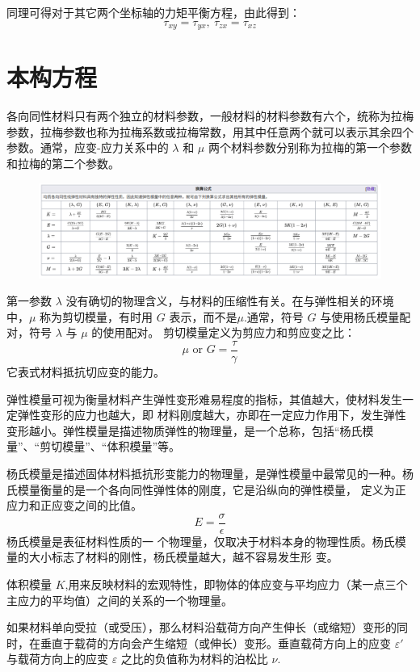 \documentclass[12pt,a4paper]{article}
\begin{document}
同理可得对于其它两个坐标轴的力矩平衡方程，由此得到：
$$
\tau_{xy}=\tau_{yx}, ~ \tau_{zx}=\tau_{xz}
$$

\section{本构方程}
各向同性材料只有两个独立的材料参数，一般材料的材料参数有六个，统称为拉梅参数，拉梅参数也称为拉梅系数或拉梅常数，用其中任意两个就可以表示其余四个参数。通常，应变-应力关系中的 $\lambda$ 和 $\mu$ 两个材料参数分别称为拉梅的第一个参数和拉梅的第二个参数。

\begin{figure}[H]
\centering
\includegraphics[scale=0.48]{./figures/19.png}
\caption{}
\end{figure}

第一参数 $\lambda$ 没有确切的物理含义，与材料的压缩性有关。在与弹性相关的环境中，$\mu$ 称为剪切模量，有时用 $G$ 表示，而不是$\mu$.通常，符号 $G$ 与使用杨氏模量配对，符号 $\lambda$ 与 $\mu$ 的使用配对。
剪切模量定义为剪应力和剪应变之比：
$$
\mu \text{ or } G = \frac{\tau}{\gamma}
$$ 
它表式材料抵抗切应变的能力。

弹性模量可视为衡量材料产生弹性变形难易程度的指标，其值越大，使材料发生一定弹性变形的应力也越大，即
材料刚度越大，亦即在一定应力作用下，发生弹性变形越小。弹性模量是描述物质弹性的物理量，是一个总称，包括“杨氏模量”、“剪切模量”、“体积模量”等。

杨氏模量是描述固体材料抵抗形变能力的物理量，是弹性模量中最常见的一种。杨氏模量衡量的是一个各向同性弹性体的刚度，它是沿纵向的弹性模量， 定义为正应力和正应变之间的比值。
$$
E = \frac{\sigma}{\epsilon}
$$
杨氏模量是表征材料性质的一
个物理量，仅取决于材料本身的物理性质。杨氏模量的大小标志了材料的刚性，杨氏模量越大，越不容易发生形
变。

体积模量 $K$,用来反映材料的宏观特性，即物体的体应变与平均应力（某一点三个主应力的平均值）之间的关系的一个物理量。

如果材料单向受拉（或受压），那么材料沿载荷方向产生伸长（或缩短）变形的同时，在垂直于载荷的方向会产生缩短（或伸长）变形。垂直载荷方向上的应变 $\varepsilon '$ 与载荷方向上的应变 $\varepsilon$ 之比的负值称为材料的泊松比 $\nu$.
\end{document}
